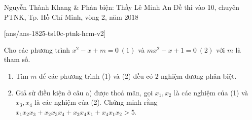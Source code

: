 \begin{name}
{Nguyễn Thành Khang \& Phản biện: Thầy Lê Minh An}
{Đề thi vào 10, chuyên PTNK, Tp. Hồ Chí Minh, vòng 2, năm 2018}
\end{name}
\setcounter{ex}{0}
[ans/ans-1825-ts10c-ptnk-hcm-v2]
\begin{ex}%
	Cho các phương trình $x^2-x+m=0\ (1)$ và $mx^2-x+1=0\ (2)$ với $m$ là tham số.
	\begin{enumerate}
		\item Tìm $m$ để các phương trình (1) và (2) đều có $2$ nghiệm dương phân biệt.
		\item Giả sử điều kiện ở câu a) được thoả mãn, gọi $x_1,x_2$ là các nghiệm của (1) và $x_3,x_4$ là các nghiệm của (2). Chứng minh rằng $x_1x_2x_3+x_2x_3x_4+x_3x_4x_1+x_4x_1x_2>5$.
	\end{enumerate}
\end{ex}

